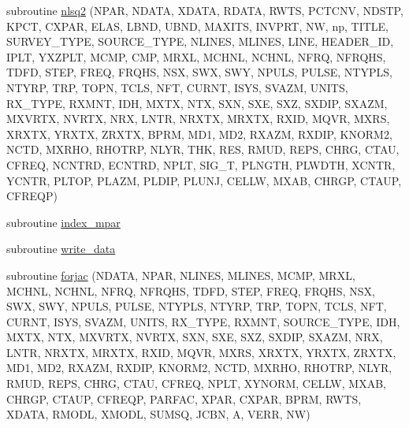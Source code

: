 \begin{DoxyCompactItemize}
subroutine \hyperlink{Leroi__c_8f90_a8f13594331f001917eefb525bce81f61}{nlsq2} (N\+P\+AR, N\+D\+A\+TA, X\+D\+A\+TA, R\+D\+A\+TA, R\+W\+TS, P\+C\+T\+C\+NV, N\+D\+S\+TP, K\+P\+CT, C\+X\+P\+AR, E\+L\+AS, L\+B\+ND, U\+B\+ND, M\+A\+X\+I\+TS, I\+N\+V\+P\+RT, NW, np, T\+I\+T\+LE, S\+U\+R\+V\+E\+Y\+\_\+\+T\+Y\+PE, S\+O\+U\+R\+C\+E\+\_\+\+T\+Y\+PE, N\+L\+I\+N\+ES, M\+L\+I\+N\+ES, L\+I\+NE, H\+E\+A\+D\+E\+R\+\_\+\+ID, I\+P\+LT, Y\+X\+Z\+P\+LT, M\+C\+MP, C\+MP, M\+R\+XL, M\+C\+H\+NL, N\+C\+H\+NL, N\+F\+RQ, N\+F\+R\+Q\+HS, T\+D\+FD, S\+T\+EP, F\+R\+EQ, F\+R\+Q\+HS, N\+SX, S\+WX, S\+WY, N\+P\+U\+LS, P\+U\+L\+SE, N\+T\+Y\+P\+LS, N\+T\+Y\+RP, T\+RP, T\+O\+PN, T\+C\+LS, N\+FT, C\+U\+R\+NT, I\+S\+YS, S\+V\+A\+ZM, U\+N\+I\+TS, R\+X\+\_\+\+T\+Y\+PE, R\+X\+M\+NT, I\+DH, M\+X\+TX, N\+TX, S\+XN, S\+XE, S\+XZ, S\+X\+D\+IP, S\+X\+A\+ZM, M\+X\+V\+R\+TX, N\+V\+R\+TX, N\+RX, L\+N\+TR, N\+R\+X\+TX, M\+R\+X\+TX, R\+X\+ID, M\+Q\+VR, M\+X\+RS, X\+R\+X\+TX, Y\+R\+X\+TX, Z\+R\+X\+TX, B\+P\+RM, M\+D1, M\+D2, R\+X\+A\+ZM, R\+X\+D\+IP, K\+N\+O\+R\+M2, N\+C\+TD, M\+X\+R\+HO, R\+H\+O\+T\+RP, N\+L\+YR, T\+HK, R\+ES, R\+M\+UD, R\+E\+PS, C\+H\+RG, C\+T\+AU, C\+F\+R\+EQ, N\+C\+N\+T\+RD, E\+C\+N\+T\+RD, N\+P\+LT, S\+I\+G\+\_\+T, P\+L\+N\+G\+TH, P\+L\+W\+D\+TH, X\+C\+N\+TR, Y\+C\+N\+TR, P\+L\+T\+OP, P\+L\+A\+ZM, P\+L\+D\+IP, P\+L\+U\+NJ, C\+E\+L\+LW, M\+X\+AB, C\+H\+R\+GP, C\+T\+A\+UP, C\+F\+R\+E\+QP)
\item 
subroutine \hyperlink{Leroi__c_8f90_a8c37d1a01918b1ce0560e8266f72f118}{index\+\_\+mpar}
\item 
subroutine \hyperlink{Leroi__c_8f90_a8213ad17958b78aad4a7bec6b845606b}{write\+\_\+data}
\item 
subroutine \hyperlink{Leroi__c_8f90_a2ce05aab7ca8a8111b718d33c0f7029c}{forjac} (N\+D\+A\+TA, N\+P\+AR, N\+L\+I\+N\+ES, M\+L\+I\+N\+ES, M\+C\+MP, M\+R\+XL, M\+C\+H\+NL, N\+C\+H\+NL, N\+F\+RQ, N\+F\+R\+Q\+HS, T\+D\+FD, S\+T\+EP, F\+R\+EQ, F\+R\+Q\+HS, N\+SX, S\+WX, S\+WY, N\+P\+U\+LS, P\+U\+L\+SE, N\+T\+Y\+P\+LS, N\+T\+Y\+RP, T\+RP, T\+O\+PN, T\+C\+LS, N\+FT, C\+U\+R\+NT, I\+S\+YS, S\+V\+A\+ZM, U\+N\+I\+TS, R\+X\+\_\+\+T\+Y\+PE, R\+X\+M\+NT, S\+O\+U\+R\+C\+E\+\_\+\+T\+Y\+PE, I\+DH, M\+X\+TX, N\+TX, M\+X\+V\+R\+TX, N\+V\+R\+TX, S\+XN, S\+XE, S\+XZ, S\+X\+D\+IP, S\+X\+A\+ZM, N\+RX, L\+N\+TR, N\+R\+X\+TX, M\+R\+X\+TX, R\+X\+ID, M\+Q\+VR, M\+X\+RS, X\+R\+X\+TX, Y\+R\+X\+TX, Z\+R\+X\+TX, M\+D1, M\+D2, R\+X\+A\+ZM, R\+X\+D\+IP, K\+N\+O\+R\+M2, N\+C\+TD, M\+X\+R\+HO, R\+H\+O\+T\+RP, N\+L\+YR, R\+M\+UD, R\+E\+PS, C\+H\+RG, C\+T\+AU, C\+F\+R\+EQ, N\+P\+LT, X\+Y\+N\+O\+RM, C\+E\+L\+LW, M\+X\+AB, C\+H\+R\+GP, C\+T\+A\+UP, C\+F\+R\+E\+QP, P\+A\+R\+F\+AC, X\+P\+AR, C\+X\+P\+AR, B\+P\+RM, R\+W\+TS, X\+D\+A\+TA, R\+M\+O\+DL, X\+M\+O\+DL, S\+U\+M\+SQ, J\+C\+BN, A, V\+E\+RR, NW)

\end{DoxyCompactItemize}
